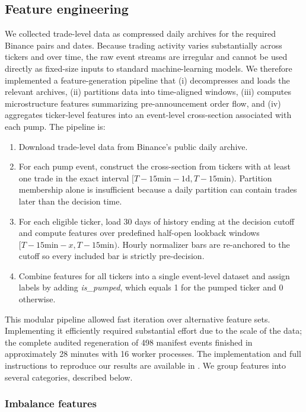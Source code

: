 \documentclass{ieeeaccess}
\begin{document}
\subsection{Feature engineering}

We collected trade-level data as compressed daily archives for the required Binance pairs and dates. Because trading activity varies substantially across tickers and over time, the raw event streams are irregular and cannot be used directly as fixed-size inputs to standard machine-learning models. We therefore implemented a feature-generation pipeline that (i) decompresses and loads the relevant archives, (ii) partitions data into time-aligned windows, (iii) computes microstructure features summarizing pre-announcement order flow, and (iv) aggregates ticker-level features into an event-level cross-section associated with each pump. The pipeline is:

\begin{enumerate}
    \item Download trade-level data from Binance's public daily archive.
    \item For each pump event, construct the cross-section from tickers with at least one trade in the exact interval $[T-15\text{min}-1\text{d},T-15\text{min})$. Partition membership alone is insufficient because a daily partition can contain trades later than the decision time.
    \item For each eligible ticker, load 30 days of history ending at the decision cutoff and compute features over predefined half-open lookback windows $[T-15\text{min}-x,T-15\text{min})$. Hourly normalizer bars are re-anchored to the cutoff so every included bar is strictly pre-decision.
    \item Combine features for all tickers into a single event-level dataset and assign labels by adding \textit{is\_pumped}, which equals 1 for the pumped ticker and 0 otherwise.
\end{enumerate}

This modular pipeline allowed fast iteration over alternative feature sets. Implementing it efficiently required substantial effort due to the scale of the data; the complete audited regeneration of 498 manifest events finished in approximately 28 minutes with 16 worker processes. The implementation and full instructions to reproduce our results are available in \cite{code_github}. We group features into several categories, described below.

\subsubsection{Imbalance features}
\end{document}
